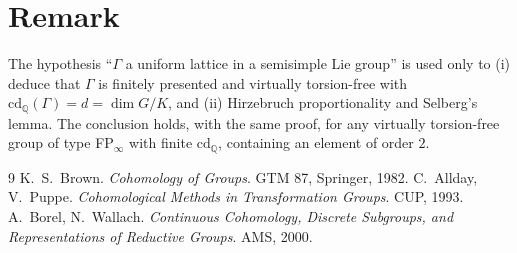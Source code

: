 \section*{Remark}

The hypothesis ``$\Gamma$ a uniform lattice in a semisimple Lie group'' is used only to (i) deduce that $\Gamma$ is finitely presented and virtually torsion-free with $\mathrm{cd}_{\mathbb Q}(\Gamma)=d=\dim G/K$, and (ii) Hirzebruch proportionality and Selberg's lemma.  The conclusion holds, with the same proof, for any virtually torsion-free group of type FP$_\infty$ with finite $\mathrm{cd}_{\mathbb Q}$, containing an element of order $2$.

\begin{thebibliography}{9}
 K.~S.~Brown.  \emph{Cohomology of Groups}.  GTM 87, Springer, 1982.
 C.~Allday, V.~Puppe.  \emph{Cohomological Methods in Transformation Groups}.  CUP, 1993.
 A.~Borel, N.~Wallach.  \emph{Continuous Cohomology, Discrete Subgroups, and Representations of Reductive Groups}.  AMS, 2000.
\end{thebibliography}


